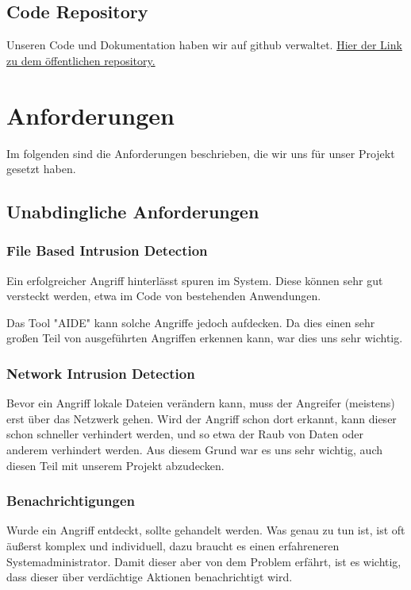 \documentclass{article}
\begin{document}
\subsection{Code Repository}
Unseren Code und Dokumentation haben wir auf github verwaltet. \href{https://github.com/rubenMiller/intrusion-detection-pi}{Hier der Link zu dem öffentlichen repository.}

\section{Anforderungen}
Im folgenden sind die Anforderungen beschrieben, die wir uns für unser Projekt gesetzt haben.

\subsection{Unabdingliche Anforderungen}
\subsubsection{File Based Intrusion Detection}
Ein erfolgreicher Angriff hinterlässt spuren im System. Diese können sehr gut versteckt werden, etwa im Code von bestehenden Anwendungen.

Das Tool "AIDE" kann solche Angriffe jedoch aufdecken. Da dies einen sehr großen Teil von ausgeführten Angriffen erkennen kann, war dies uns sehr wichtig.

\subsubsection{Network Intrusion Detection}
Bevor ein Angriff lokale Dateien verändern kann, muss der Angreifer (meistens) erst über das Netzwerk gehen. Wird der Angriff schon dort erkannt, kann dieser schon schneller verhindert werden, und so etwa der Raub von Daten oder anderem verhindert werden. Aus diesem Grund war es uns sehr wichtig, auch diesen Teil mit unserem Projekt abzudecken.

\subsubsection{Benachrichtigungen}
Wurde ein Angriff entdeckt, sollte gehandelt werden. Was genau zu tun ist, ist oft äußerst komplex und individuell, dazu braucht es einen erfahreneren Systemadministrator. Damit dieser aber von dem Problem erfährt, ist es wichtig, dass dieser über verdächtige Aktionen benachrichtigt wird.
\end{document}
